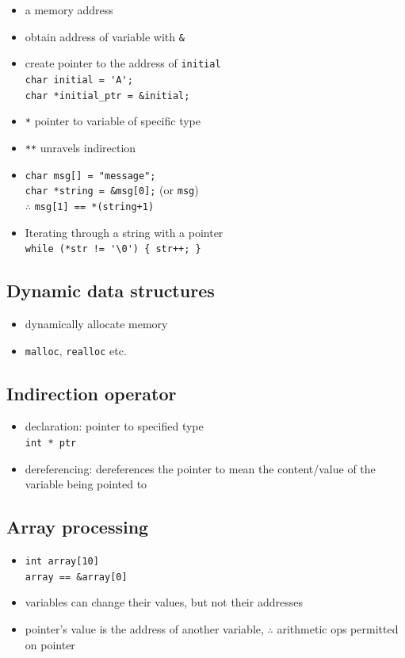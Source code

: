 \documentclass[10pt, multicolumn, a4paper]{article}
\begin{document}
\begin{multicols}{2}
	\begin{itemize}
	\item a memory address
	\item obtain address of variable with \verb|&|
	\item create pointer to the address of \verb|initial| \\
		\verb|char initial = 'A';| \\ \verb|char *initial_ptr = &initial;|
	\item \verb|*| pointer to variable of specific type
	\item \verb|**| unravels indirection
	\item \verb|char msg[] = "message";| \\ \verb|char *string = &msg[0];| (or \verb|msg|)
		\\ $\therefore$ \verb|msg[1] == *(string+1)|
	\item Iterating through a string with a pointer
		\\ \verb|while (*str != '\0') { str++; }|
	\end{itemize}
	\subsection*{Dynamic data structures}
	\begin{itemize}
	\item dynamically allocate memory
	\item \verb|malloc|, \verb|realloc| etc.
	\end{itemize}
	\subsection*{Indirection operator}
	\begin{itemize}
	\item declaration: pointer to specified type \\ \verb|int * ptr|
	\item dereferencing: dereferences the pointer to mean the content/value of the variable being pointed to
	\end{itemize}
	\subsection*{Array processing}
	\begin{itemize}
	\item \verb|int array[10]| \\ \verb|array == &array[0]|
	\item variables can change their values, but not their addresses
	\item pointer's value is the address of another variable, $\therefore$ arithmetic ops permitted on pointer
	\end{itemize}

\end{multicols}
\end{document}
